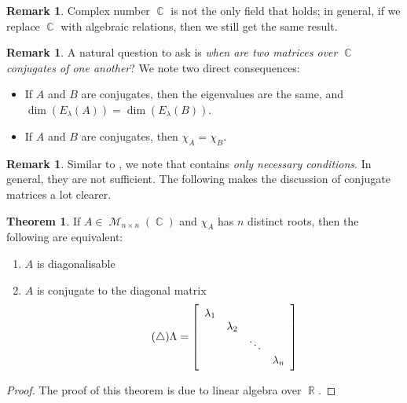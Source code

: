 \documentclass[11pt]{amsart} %
\theoremstyle{definition}
\newtheorem{theorem}[definition]{Theorem}
\theoremstyle{definition}
\newtheorem{remark}[definition]{Remark}
\DeclareMathOperator{\R}{\mathbb{R}}
\DeclareMathOperator{\Com}{\mathbb{C}}
\DeclareMathOperator{\Ma}{\mathcal{M}}
\numberwithin{equation}{section}
\begin{document}
\begin{remark}
	Complex number $\Com$ is not the only field that  holds; in general, if we replace $\Com$ with algebraic relations, then we still get the same result.
\end{remark}

\begin{remark}
	\label{consequencesofconjugacy}
	A natural question to ask is \textit{when are two matrices over $\Com$ conjugates of one another}? We note two direct consequences:
	\begin{itemize}
		\item If $A$ and $B$ are conjugates, then the eigenvalues are the same, and $\dim (E_{\lambda} (A) ) =\dim (E_{\lambda} (B) )$.
		\item If $A$ and $B$ are conjugates, then $\chi_A =\chi_B$.
	\end{itemize}
\end{remark}

\begin{remark}
	Similar to , we note that  contains \textit{only necessary conditions}. In general, they are not sufficient. The following makes the discussion of conjugate matrices a lot clearer.
\end{remark}

\begin{theorem}
	If $A \in \Ma_{n \times n} (\Com)$ and $\chi_A$ has $n$ distinct roots, then the following are equivalent:
	\begin{enumerate}%
		\item $A$ is diagonalisable
		\item $A$ is conjugate to the diagonal matrix
		\begin{equation}
		\label{eigenvaluediagmatrix}
		\tag{$\triangle$}
		\Lambda = \left[ \begin{array}{c c c c}
		\lambda_1 & & & \\
		 & \lambda_2 & & \\
		 & & \ddots & \\
		 & & & \lambda_n
		\end{array} \right]
		\end{equation}
	\end{enumerate}
\end{theorem}

\begin{proof}
	The proof of this theorem is due to linear algebra over $\R$.
\end{proof}
\end{document}
